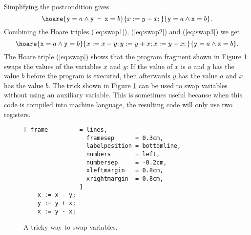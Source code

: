 Simplifying the postcondition gives
\begin{equation}
  \label{eq:swap3}
  \hoare{\texttt{y} = a \wedge \texttt{y - x} = b}{x := y - x;}{ \texttt{y} = a \wedge \texttt{x} = b}.   
\end{equation}
Combining the Hoare triples (\ref{eq:swap1}), (\ref{eq:swap2}) and (\ref{eq:swap3})
we get
\begin{equation}
  \label{eq:swap}
  \hoare{\texttt{x} = a \wedge \texttt{y} = b}{x:=x-y; y:=y+x; x:=y-x;}{ 
         \texttt{y} = a \wedge \texttt{x} = b}.   
\end{equation}
The Hoare triple (\ref{eq:swap}) shows that the program fragment shown in Figure
\ref{fig:swap} swaps the values of the variables $x$ and $y$: If the value of 
$x$ is $a$ and $y$ has the value $b$ before the program is executed, then afterwards
$y$ has the value $a$ and $x$ has the value $b$.  The trick shown in Figure
\ref{fig:swap} 
can be used to swap variables without using an auxiliary variable.  This is sometimes useful because
when this code is compiled into machine language, the resulting code will only use two registers.


\begin{figure}[!ht]
\centering
\begin{Verbatim}[ frame         = lines, 
                  framesep      = 0.3cm, 
                  labelposition = bottomline,
                  numbers       = left,
                  numbersep     = -0.2cm,
                  xleftmargin   = 0.8cm,
                  xrightmargin  = 0.8cm,
                ]
    x := x - y;
    y := y + x;
    x := y - x;
\end{Verbatim}
\vspace*{-0.3cm}
\caption{A tricky way to swap variables.}
\label{fig:swap}
\end{figure}



